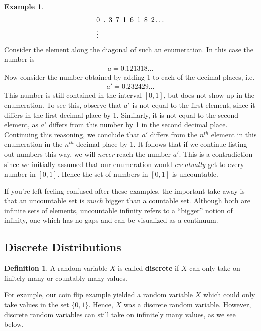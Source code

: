 \documentclass{tufte-book}
\theoremstyle{definition}
\numberwithin{theorem}{section}
\newtheorem{definition}[theorem]{Definition}
\numberwithin{definition}{section}
\numberwithin{lemma}{section}
\numberwithin{corollary}{section}
\numberwithin{proposition}{section}
\numberwithin{remark}{section}
\numberwithin{claim}{section}
\numberwithin{observation}{section}
\numberwithin{fact}{section}
\numberwithin{assumption}{section}
\newtheorem{example}[theorem]{Example}
\numberwithin{example}{section}
\numberwithin{exercise}{section}
\begin{document}
\begin{example}
\begin{align*}
&0 \hspace{.5em}.\hspace{.5em}3\hspace{.5em} 7\hspace{.5em} 1\hspace{.5em} 6 \hspace{.5em}1\hspace{.5em} 8\hspace{.5em} 2 \dots \\
&\vdots
\end{align*}
Consider the element along the diagonal of such an enumeration. In this case the number is
\begin{align*}
a \doteq 0.121318\dots
\end{align*}
Now consider the number obtained by adding 1 to each of the decimal places, i.e.
\begin{align*}
a' \doteq 0.232429\dots
\end{align*}
This number is still contained in the interval $[0,1]$, but does not show up in the enumeration. To see this, observe that $a'$ is not equal to the first element, since it differs in the first decimal place by 1. Similarly, it is not equal to the second element, as $a'$ differs from this number by 1 in the second decimal place. Continuing this reasoning, we conclude that $a'$ differs from the $n^{th}$ element in this enumeration in the $n^{th}$ decimal place by 1. It follows that if we continue listing out numbers this way, we will \textit{never} reach the number $a'$. This is a contradiction since we initially assumed that our enumeration would \textit{eventually} get to every number in $[0,1]$. Hence the set of numbers in $[0,1]$ is uncountable.
\end{example}

If you're left feeling confused after these examples, the important take away is that an uncountable set is \textit{much} bigger than a countable set. Although both are infinite sets of elements, uncountable infinity refers to a ``bigger'' notion of infinity, one which has no gaps and can be visualized as a continuum.

\subsection{Discrete Distributions}
\begin{definition}
A random variable $X$ is called \textbf{discrete} if $X$ can only take on finitely many or countably many values.
\end{definition}
For example, our coin flip example yielded a random variable $X$ which could only take values in the set $\{0,1\}$. Hence, $X$ was a discrete random variable. However, discrete random variables can still take on infinitely many values, as we see below.
\end{document}
